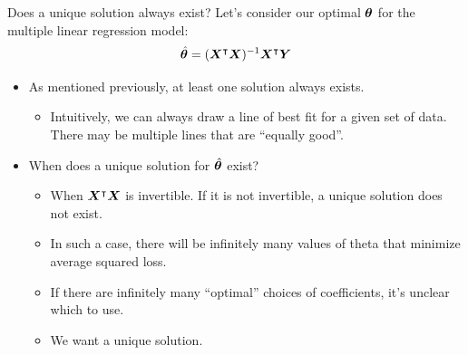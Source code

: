 \documentclass[aspectratio=169]{../latex_main/tntbeamer}  %
\begin{document}
	
	\begin{frame}{Does a unique solution always exist?}
	   Let’s consider our optimal $\bm{\theta}$ for the multiple linear regression model:
	   \begin{equation*}
	       \hat{\bm{\theta}} = (\bm{X}^\intercal\bm{X})^{-1} \bm{X}^\intercal\bm{Y}
	   \end{equation*}
	    
	    \begin{itemize}
	        \item As mentioned previously, at least one solution always exists.
	        \begin{itemize}
	            \item Intuitively, we can always draw a line of best fit for a given set of data. There may be multiple lines that are “equally good”.
	        \end{itemize}
	        \item When does a unique solution for   $\hat{\bm{\theta}}$  exist?
            \begin{itemize}
                \item When     $\bm{X}^\intercal\bm{X}$      is invertible. If it is not invertible, a unique solution does not exist.
                \item In such a case, there will be infinitely many values of theta that minimize average squared loss.
                \item If there are infinitely many “optimal” choices of coefficients, it’s unclear which to use.
                \item We want a unique solution.
            \end{itemize}
	    \end{itemize}

	\end{frame}
	
\end{document}

